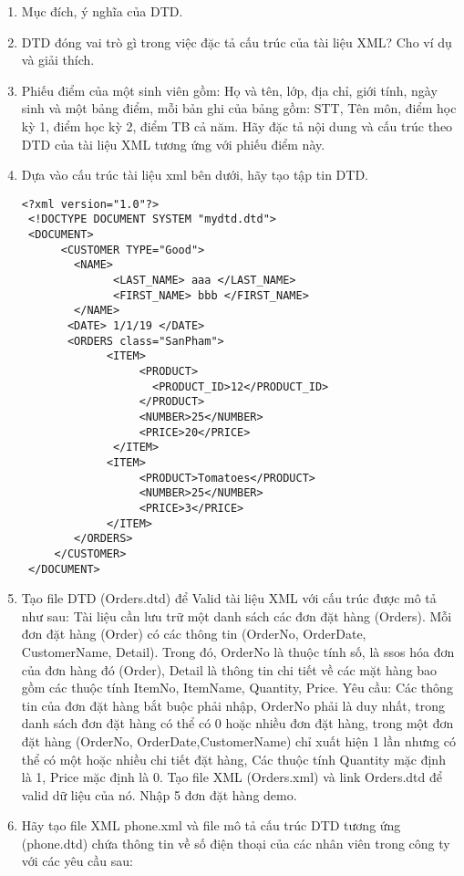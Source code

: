 \begin{enumerate}
\item 	Mục đích, ý nghĩa của DTD.
\item	DTD đóng vai trò gì trong việc đặc tả cấu trúc của tài liệu XML? Cho ví dụ và giải thích.
\item	Phiếu điểm của một sinh viên gồm: Họ và tên, lớp, địa chỉ, giới tính, ngày sinh và một bảng điểm, mỗi bản ghi của bảng gồm: STT, Tên môn, điểm học kỳ 1, điểm học kỳ 2, điểm TB cả năm. Hãy đặc tả nội dung và cấu trúc theo DTD của tài liệu XML tương ứng với phiếu điểm này.
\item Dựa vào cấu trúc tài liệu xml bên dưới, hãy tạo tập tin DTD.
\lstset{language=XML}
\begin{lstlisting}
<?xml version="1.0"?>
 <!DOCTYPE DOCUMENT SYSTEM "mydtd.dtd">
 <DOCUMENT>
      <CUSTOMER TYPE="Good">
        <NAME>
	          <LAST_NAME> aaa </LAST_NAME>
	          <FIRST_NAME> bbb </FIRST_NAME>
        </NAME>
       <DATE> 1/1/19 </DATE>
       <ORDERS class="SanPham">
	         <ITEM>
		          <PRODUCT> 
		          	<PRODUCT_ID>12</PRODUCT_ID>
		          </PRODUCT>
		          <NUMBER>25</NUMBER>
		          <PRICE>20</PRICE>
	          </ITEM>
	         <ITEM>
		          <PRODUCT>Tomatoes</PRODUCT>
		          <NUMBER>25</NUMBER>
		          <PRICE>3</PRICE>
	         </ITEM>
        </ORDERS>
     </CUSTOMER>
 </DOCUMENT>
\end{lstlisting}
\item	Tạo file DTD (Orders.dtd) để Valid tài liệu XML với cấu trúc được mô tả như sau:
\subitem Tài liệu cần lưu trữ một danh sách các đơn đặt hàng  (Orders). Mỗi đơn đặt hàng (Order) có các thông tin (OrderNo, OrderDate, CustomerName, Detail). Trong đó, OrderNo là thuộc tính số, là ssos hóa đơn của đơn hàng đó (Order), Detail là thông tin chi tiết về các mặt hàng bao gồm các thuộc tính ItemNo, ItemName, Quantity, Price.
\subitem  Yêu cầu: Các thông tin của đơn đặt hàng bắt buộc phải nhập, OrderNo phải là duy nhất, trong danh sách đơn đặt hàng có thể có 0 hoặc nhiều đơn đặt hàng, trong một đơn đặt hàng (OrderNo, OrderDate,CustomerName) chỉ xuất hiện 1 lần nhưng có thể có một hoặc nhiều chi tiết đặt hàng, Các thuộc tính Quantity mặc định là 1, Price mặc định là 0.
\subitem Tạo file XML (Orders.xml) và link Orders.dtd để valid dữ liệu của nó. Nhập 5 đơn đặt hàng demo.
\item Hãy tạo file XML phone.xml và file mô tả cấu trúc DTD tương ứng (phone.dtd) chứa thông tin về số điện thoại của các nhân viên trong công ty với các yêu cầu sau: 
\begin{itemize}


\end{itemize}
\end{enumerate}
